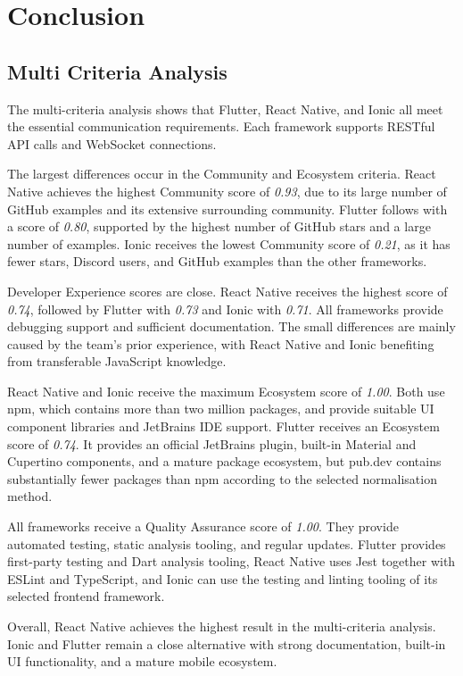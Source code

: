 \section{Conclusion}\label{sec:conclusion}

\subsection{Multi Criteria Analysis}
The multi-criteria analysis shows that Flutter, React Native, and Ionic all meet the essential communication requirements.
Each framework supports RESTful API calls and WebSocket connections.

The largest differences occur in the Community and Ecosystem criteria.
React Native achieves the highest Community score of \emph{0.93}, due to its large number of GitHub examples and its extensive surrounding community.
Flutter follows with a score of \emph{0.80}, supported by the highest number of GitHub stars and a large number of examples.
Ionic receives the lowest Community score of \emph{0.21}, as it has fewer stars, Discord users, and GitHub examples than the other frameworks.

Developer Experience scores are close.
React Native receives the highest score of \emph{0.74}, followed by Flutter with \emph{0.73} and Ionic with \emph{0.71}.
All frameworks provide debugging support and sufficient documentation.
The small differences are mainly caused by the team's prior experience, with React Native and Ionic benefiting from transferable JavaScript knowledge.

React Native and Ionic receive the maximum Ecosystem score of \emph{1.00}.
Both use npm, which contains more than two million packages, and provide suitable UI component libraries and JetBrains IDE support.
Flutter receives an Ecosystem score of \emph{0.74}.
It provides an official JetBrains plugin, built-in Material and Cupertino components, and a mature package ecosystem, but pub.dev contains substantially fewer packages than npm according to the selected normalisation method.

All frameworks receive a Quality Assurance score of \emph{1.00}.
They provide automated testing, static analysis tooling, and regular updates.
Flutter provides first-party testing and Dart analysis tooling, React Native uses Jest together with ESLint and TypeScript, and Ionic can use the testing and linting tooling of its selected frontend framework.

Overall, React Native achieves the highest result in the multi-criteria analysis.
Ionic and Flutter remain a close alternative with strong documentation, built-in UI functionality, and a mature mobile ecosystem.

